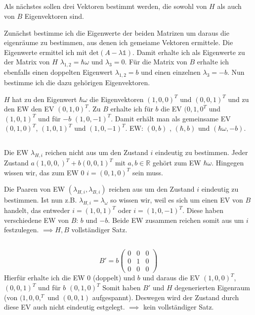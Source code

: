 \subsection{}
Als nächstes sollen drei Vektoren bestimmt werden, die sowohl von $H$ als auch von $B$ Eigenvektoren sind.

Zunächst bestimme ich die Eigenwerte der beiden Matrizen um daraus die eigenräume zu bestimmen, aus denen ich gemeiame Vektoren ermittele.
Die Eigenwerte ermittel ich mit $\text{det}(A-\lambda \mathbb{1})$. 
Damit erhalte ich als Eigenwerte zu der Matrix von $H$ $\lambda_{1,2}=\hbar\omega$ und $\lambda_3=0$.
Für die Matrix von $B$ erhalte ich ebenfalls einen doppelten Eigenwert $\lambda_{1,2}=b$ und einen einzelnen $\lambda_3=-b$.
Nun bestimme ich die dazu gehörigen Eigenvektoren.

$H$ hat zu den Eigenwert $\hbar\omega$ die Eigenvektoren $(1,0,0)^T$ und $(0,0,1)^T$ und zu den EW den EV $(0,1,0)^T$. Zu $B$ erhalte ich für $b$ die EV $(0,1,0^T$ und $(1,0,1)^T$ und für $-b$ $(1,0,-1)^T$.
Damit erhält man als gemeinsame EV $(0,1,0)^T$, $(1,0,1)^T$ und $(1,0,-1)^T$.
EW: $(0,b)$ , $(\hbar,b)$ und $(\hbar\omega,-b)$.

\subsection{}
Die EW $\lambda_{H,i}$ reichen nicht aus um den Zustand $i$ eindeutig zu bestimmen. Jeder Zustand $a(1,0,0,)^T+b(0,0,1)^T$ mit $a,b \in \mathbb R $ gehört zum EW $\hbar\omega$. Hingegen wissen wir, das zum EW $0$ $i=(0,1,0)^T$ sein muss.

Die Paaren von EW $(\lambda_{H,i},\lambda_{B,i})$ reichen aus um den Zustand $i$ eindeutig zu bestimmen. Ist nun z.B. $\lambda_{H,i} =\lambda_\omega$ so wissen wir, weil es sich um einen EV von $B$ handelt, das entweder $i=(1,0,1)^T$ oder $i=(1,0,-1)^T$. Diese haben verschiedene EW von $B$: $b$ und $-b$. Beide EW zusammen reichen somit aus um $i$festzulegen. $\implies {H,B}$ vollständiger Satz.

\subsection{}
\[
    B'=b\begin{pmatrix}
        0 &0 &0 \\
        0 &1 &0 \\
        0 &0 &0
    \end{pmatrix}
\]
Hierfür erhalte ich die EW $0$ (doppelt) und $b$ und daraus die EV $(1,0,0)^T$, $(0,0,1)^T$ und für $b$ $(0,1,0)^T$
Somit haben $B'$ und $H$ degenerierten Eigenraum (von $(1,0,0,^T$ und $(0,0,1)$ aufgespannt).
Deswegen wird der Zustand durch diese EV auch nicht eindeutig estgelegt. $\implies$ kein vollständiger Satz.

